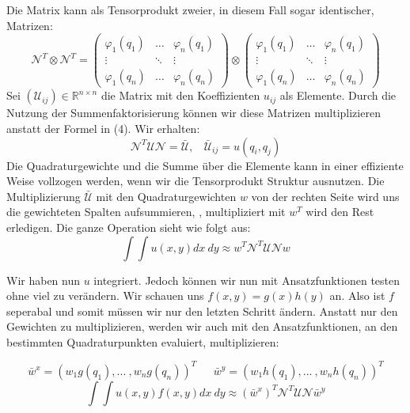Die Matrix kann als Tensorprodukt zweier, in diesem Fall sogar identischer, Matrizen:
\begin{equation}
\mathcal{N}^T \otimes \mathcal{N}^T =
\begin{pmatrix}
\varphi_1(q_1) & \hdots & \varphi_n(q_1) \\
\vdots & \ddots & \vdots \\
\varphi_1(q_n) & \hdots & \varphi_n(q_n)
\end{pmatrix}
\otimes
\begin{pmatrix}
\varphi_1(q_1) & \hdots & \varphi_n(q_1) \\
\vdots & \ddots & \vdots \\
\varphi_1(q_n) & \hdots & \varphi_n(q_n)
\end{pmatrix}
\end{equation}
Sei $(\mathcal{U}_{ij}) \in \mathbb{R}^{n \times n}$ die Matrix mit den Koeffizienten $u_{ij}$ als Elemente.
Durch die Nutzung der Summenfaktorisierung können wir diese Matrizen multiplizieren anstatt der Formel in (4). Wir erhalten: 
\begin{equation}
\mathcal{N}^T \mathcal{U} \mathcal{N} = \bar{\mathcal{U}}, \ \ \ \ \bar{\mathcal{U}}_{ij} = u(q_i,q_j)
\end{equation}
Die Quadraturgewichte und die Summe über die Elemente kann in einer effiziente Weise vollzogen werden, wenn wir die Tensorprodukt Struktur ausnutzen. Die Multiplizierung $\bar{\mathcal{U}}$ mit den Quadraturgewichten $w$ von der rechten Seite wird uns die gewichteten Spalten aufsummieren, , multipliziert mit $w^T$ wird den Rest erledigen. Die ganze Operation sieht wie folgt aus: 
\begin{equation}
\int \int u(x,y) dx \ dy \approx w^T \mathcal{N}^T \mathcal{U} \mathcal{N} w
\end{equation} 

Wir haben nun $u$ integriert. Jedoch können wir nun mit Ansatzfunktionen testen ohne viel zu verändern.
Wir schauen uns $f(x,y)=g(x)h(y)$ an. Also ist $f$ seperabal und somit müssen wir nur den letzten Schritt ändern. Anstatt nur den Gewichten zu multiplizieren, werden wir auch mit den Ansatzfunktionen, an den bestimmten Quadraturpunkten evaluiert, multiplizieren:

\[\bar{w}^x=(w_1 g(q_1), ... \ ,w_n g(q_n))^T \ \ \ \ \ \ \ \bar{w}^y=(w_1 h(q_1), ... \ ,w_n h(q_n))^T\]
\begin{equation}
\int \int u(x,y) f(x,y) dx \ dy \approx (\bar{w}^x)^T \mathcal{N}^T \mathcal{U} \mathcal{N} \bar{w}^y
\end{equation}

